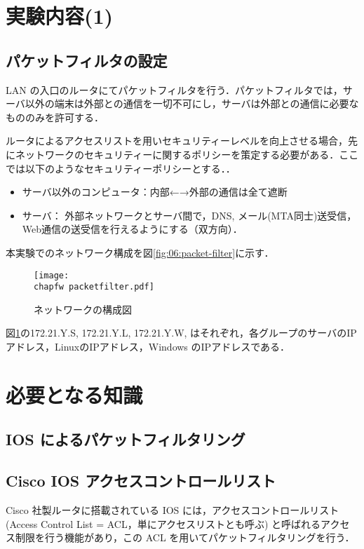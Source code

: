 \clearpage

\section{実験内容(1)}

\subsection*{パケットフィルタの設定}

LAN の入口のルータにてパケットフィルタを行う．パケットフィルタでは，サーバ以外の端末は外部との通信を一切不可にし，サーバは外部との通信に必要なもののみを許可する．

ルータによるアクセスリストを用いセキュリティーレベルを向上させる場合，先にネットワークのセキュリティーに関するポリシーを策定する必要がある．ここでは以下のようなセキュリティーポリシーとする．．

\begin{itemize}
 \item サーバ以外のコンピュータ：内部←→外部の通信は全て遮断
 \item サーバ： 外部ネットワークとサーバ間で，DNS, メール(MTA同士)送受信，Web通信の送受信を行えるようにする（双方向）．
\end{itemize}
本実験でのネットワーク構成を図\ref{fig:06:packet-filter}に示す．
\begin{figure}
  \centering
  \texttt{[image: \\chapfw packetfilter.pdf]}
  \caption{ネットワークの構成図}
  \label{fig:06:packet-filter1}
\end{figure}
図\ref{fig:06:packet-filter1}の172.21.Y.S, 172.21.Y.L, 172.21.Y.W, はそれぞれ，各グループのサーバのIPアドレス，LinuxのIPアドレス，Windows のIPアドレスである．

\section{必要となる知識}

\subsection{IOS によるパケットフィルタリング}

\subsection*{Cisco IOS アクセスコントロールリスト}
Cisco 社製ルータに搭載されている IOS には，アクセスコントロールリスト
(Access Control List = ACL，単にアクセスリストとも呼ぶ) と呼ばれるアクセ
ス制限を行う機能があり，この ACL を用いてパケットフィルタリングを行う．

